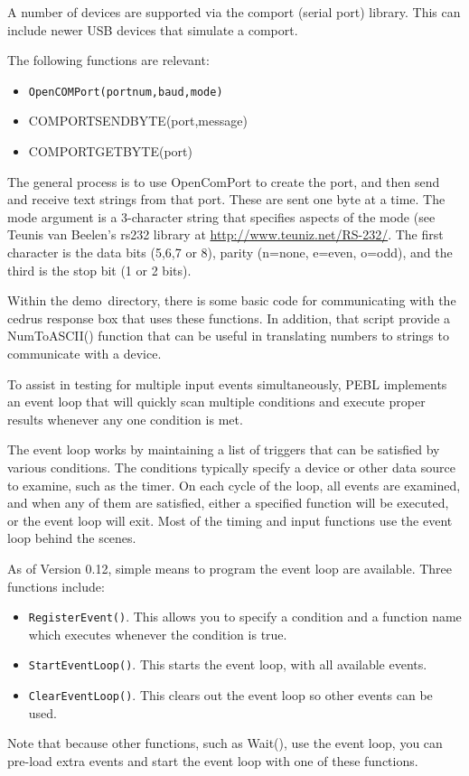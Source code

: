 
A number of devices are supported via the comport (serial port) library.  This can include newer USB devices that simulate a comport.

The following functions are relevant:
\begin{itemize}
\item \texttt{OpenCOMPort(portnum,baud,mode)}
\item COMPORTSENDBYTE(port,message)
\item COMPORTGETBYTE(port)
\end{itemize}


The general process is to use OpenComPort to create the port, and then send and receive text strings from that port.  These are sent one byte at a time. The mode argument is a 3-character string that specifies aspects of the mode (see  Teunis van Beelen's rs232 library at \url{http://www.teuniz.net/RS-232/}. The first character is the data bits (5,6,7 or 8), parity (n=none, e=even, o=odd), and the third is the stop bit (1 or 2 bits).


Within the demo\ directory, there is some basic code for communicating with the cedrus response box that uses these functions.  In addition, that script provide a NumToASCII() function that can be useful in translating numbers to strings to communicate with a device.





To assist in testing for multiple input events simultaneously, 
PEBL implements an event loop that will quickly scan multiple conditions
and execute proper results whenever any one condition is met.  

The event loop works by maintaining a list of triggers that can be satisfied by various conditions. The conditions typically specify a device or other data source to examine, such as the timer.  On each cycle of the loop, all events are examined, and when any of them are satisfied, either a specified function will be executed, or the event loop will exit.  Most of the timing and input functions use the event loop behind the scenes.

As of Version  0.12, simple means to program the event loop are available.  Three functions include:
\begin{itemize}
\item \texttt{RegisterEvent()}.  This allows you to specify a condition and a function name which executes whenever the condition is true.      
\item \texttt{StartEventLoop()}.  This starts the event loop, with all available events.     
\item \texttt{ClearEventLoop()}.  This clears out the event loop so other events can be used.     
\end{itemize}
Note that because other functions, such as Wait(), use the event loop, you can pre-load extra events and start the event loop with one of these functions.

